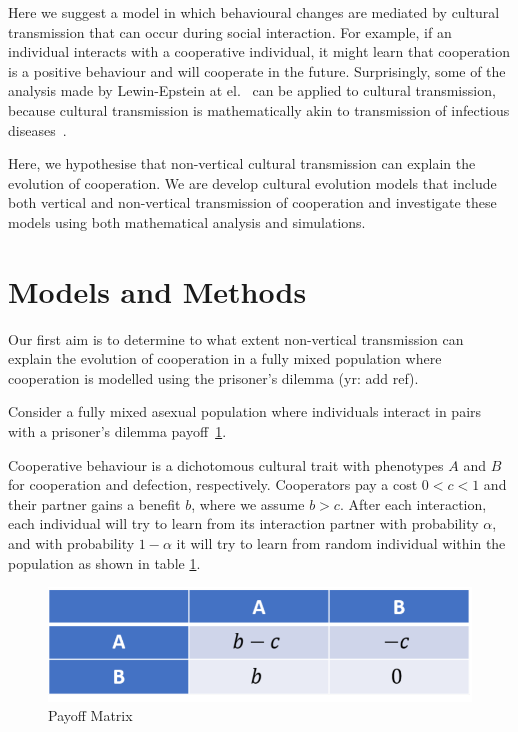 \documentclass{article}
\begin{document}
Here we suggest a model in which behavioural changes are mediated by cultural transmission that can occur during social interaction. For example, if an individual interacts with a cooperative individual, it might learn that cooperation is a positive behaviour and will cooperate in the future. Surprisingly, some of the analysis made by Lewin-Epstein at el.~\cite{lewin2017microbes} can be applied to cultural transmission, because cultural transmission is mathematically akin to transmission of infectious diseases~\cite{cavalli1981cultural}.

Here, we hypothesise that non-vertical cultural transmission can explain the evolution of cooperation. We are develop cultural evolution models that include both vertical and non-vertical transmission of cooperation and investigate these models using both mathematical analysis and simulations. 


\section*{Models and Methods}

Our first aim is to determine to what extent non-vertical transmission can explain the evolution of cooperation in a fully mixed population where cooperation is modelled using the prisoner's dilemma (yr: add ref).

Consider a fully mixed asexual population where individuals interact in pairs with a prisoner's dilemma payoff~\ref{fig:payoff}.
 
Cooperative behaviour is a dichotomous cultural trait with phenotypes $A$ and $B$ for cooperation and defection, respectively. Cooperators pay a cost $0<c<1$ and their partner gains a benefit $b$, where we assume $b>c$.
After each interaction, each individual will try to learn from its interaction partner with probability $\alpha$, and with probability $1-\alpha$ it will try to learn from random individual within the population as shown in table \ref{fig:payoff}. 
\begin{figure}[h!]
  \centering
  \includegraphics[scale=0.5]{payoff.pdf}
  \caption{Payoff Matrix}
  \label{fig:payoff}
\end{figure}
\end{document}
